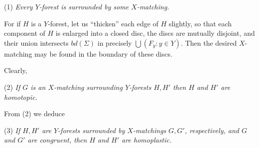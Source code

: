 \hspace*{12pt}(1) \textit{Every $Y$-forest is surrounded by some $X$-matching.}

For if $H$ is a $Y$-forest, let us ``thicken'' each edge of $H$ slightly, so that each component of $H$ is enlarged into a closed disc, the discs are mutually disjoint, and their union intersects $bd(\Sigma)$ in precisely $\bigcup (F_y \colon y \in Y)$. Then the desired $X$-matching may be found in the boundary of these discs.

Clearly,

\hspace*{12pt}(2) \textit{If $G$ is an $X$-matching surrounding $Y$-forests $H, H'$ then $H$ and $H'$ are homotopic.}

From (2) we deduce

\hspace*{12pt}(3) \textit{If $H, H'$ are $Y$-forests surrounded by $X$-matchings $G, G'$, respectively, and $G$ and $G'$ are congruent, then $H$ and $H'$ are homoplastic.}
